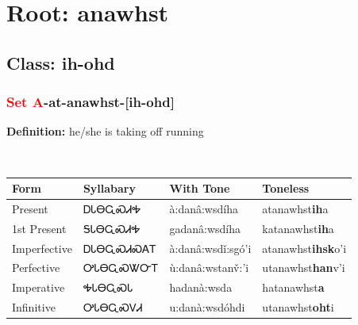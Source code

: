 \needspace{4in}
\section*{Root: anawhst}
\nopagebreak
{}
\needspace{3in}
\subsection*{Class: ih-ohd}
\nopagebreak
\needspace{2in}
\subsubsection*{\textcolor{Red}{Set A}{-}at{-}\textbf{anawhst}{-}[ih-ohd]}
\nopagebreak
\textbf{Definition: } he/she is taking off running
\\[0.5em]
\begin{tabularx}{\textwidth}{l X X X}%
\toprule%
\textbf{Form}&\textbf{Syllabary}&\textbf{With Tone}&\textbf{Toneless}\\%
\midrule%
Present&ᎠᏓᎾᏩᏍᏗᎭ&à:danâ:wsdíha&atanawhst\textbf{ih}a\\%
1st Present&ᎦᏓᎾᏩᏍᏗᎭ&gadanâ:wsdíha&katanawhst\textbf{ih}a\\%
Imperfective&ᎠᏓᎾᏩᏍᏗᏍᎪᎢ&à:danâ:wsdǐ:sgó’i&atanawhst\textbf{ihsk}o'i\\%
Perfective&ᎤᏓᎾᏩᏍᏔᏅᎢ&ù:danâ:wstanv̌:’i&utanawhst\textbf{han}v'i\\%
Imperative&ᎭᏓᎾᏩᏍᏓ&hadanà:wsda&hatanawhst\textbf{a}\\%
Infinitive&ᎤᏓᎾᏩᏍᏙᏗ&u:danà:wsdóhdi&utanawhst\textbf{oht}i\\%
\bottomrule%
\end{tabularx}
\\[1em]